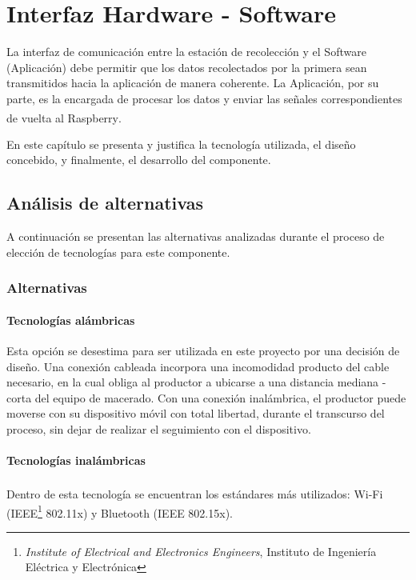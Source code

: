 \chapter{Interfaz Hardware - Software}
\label{capituloInterfaz}
\par La interfaz de comunicación entre la estación de recolección y el Software (Aplicación) debe permitir que los datos recolectados por la primera sean transmitidos hacia la aplicación de manera coherente. La Aplicación, por su parte, es la encargada de procesar los datos y enviar las señales correspondientes de vuelta al Raspberry\textsuperscript{\textregistered}.
\par En este capítulo se presenta y justifica la tecnología utilizada, el diseño concebido, y finalmente, el desarrollo del componente.

    \section{Análisis de alternativas}
    \par A continuación se presentan las alternativas analizadas durante el proceso de elección de tecnologías para este componente.
        \subsection{Alternativas}
            \subsubsection{Tecnologías alámbricas}
                \par Esta opción se desestima para ser utilizada en este proyecto por una decisión de diseño. Una conexión cableada incorpora una incomodidad producto del cable necesario, en la cual obliga al productor a ubicarse a una distancia mediana - corta del equipo de macerado. Con una conexión inalámbrica, el productor puede moverse con su dispositivo móvil con total libertad, durante el transcurso del proceso, sin dejar de realizar el seguimiento con el dispositivo. 
            \subsubsection{Tecnologías inalámbricas}
                \par Dentro de esta tecnología se encuentran los estándares más utilizados: Wi-Fi\textsuperscript{\textregistered} (IEEE\footnote{ \textit{Institute of Electrical and Electronics Engineers}, Instituto de Ingeniería Eléctrica y Electrónica} 802.11x) y Bluetooth\textsuperscript{\textregistered} (IEEE 802.15x).
                
